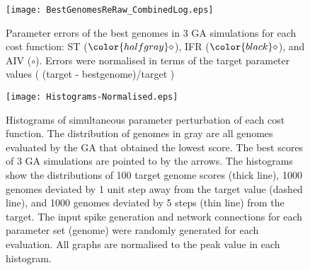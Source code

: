 \clearpage

\begin{figure}[tb!]
  \centering
  \texttt{[image: BestGenomesReRaw\_CombinedLog.eps]}
  \caption{Parameter errors of the best genomes in 3 GA
    simulations for each cost function: ST (${\color{halfgray} \diamond }$), IFR (${\color{black} \diamond }$), and AIV (${\circ}$). Errors were normalised in terms
    of the target parameter values ( (target - bestgenome)/target )}\label{fig:R2b}
\end{figure}






\newpage


\begin{figure}[tb!]
  \centering
  \texttt{[image: Histograms-Normalised.eps]}  
  \caption{Histograms of simultaneous parameter perturbation of each cost
    function. The distribution of genomes in gray are all genomes evaluated by
    the GA that obtained the lowest score. The best scores of 3 GA simulations
    are pointed to by the arrows. The histograms show the distributions of 100
    target genome scores (thick line), 1000 genomes deviated by 1 unit step away
    from the target value (dashed line), and 1000 genomes deviated by 5 steps
    (thin line) from the target. The input spike generation and network
    connections for each parameter set (genome) were randomly generated for each
    evaluation.  All graphs are normalised to the peak value in each
    histogram.\label{fig:R3}}
\end{figure}

